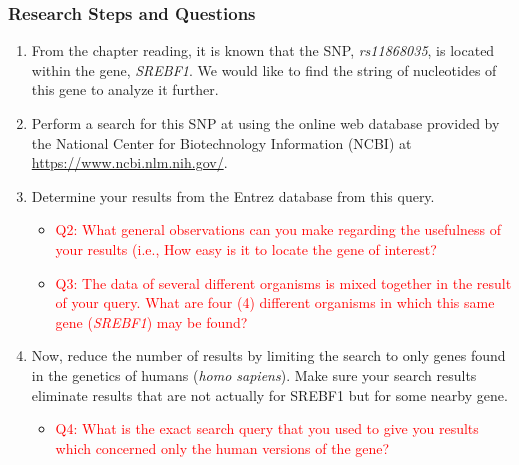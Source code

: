 \subsubsection*{Research Steps and Questions}
\begin{enumerate}
	\item From the chapter reading, it is known that the SNP, \emph{rs11868035}, is located within the gene, \emph{SREBF1}. We would like to find the string of nucleotides of this gene to analyze it further.  
	
	\item Perform a search for this SNP at using the online web database provided by the National Center for Biotechnology Information (NCBI) at \url{https://www.ncbi.nlm.nih.gov/}. 
	\begin{itemize}
		\color{red}{\item Q1: According to NCBI, which particular database are you using to find this gene?}
	\end{itemize}
	
	
	\item Determine your results from the Entrez database from this query.
	\begin{itemize}
		\item \textcolor{red}{ Q2: What general observations can you make regarding the usefulness of your results (i.e., How easy is it to locate the gene of interest?}
		\item \textcolor{red}{ Q3: The data of several different organisms is mixed together in the result of your query. What are four (4) different organisms in which this same gene (\emph{SREBF1}) may be found?}
	\end{itemize}
	\item Now, reduce the number of results by limiting the search to only genes found in the genetics of humans (\emph{homo sapiens}). Make sure your search results eliminate results that are not actually for SREBF1 but for some nearby gene. 
	\begin{itemize}
		\item \textcolor{red}{ Q4: What is the exact search query that you used to give you results which concerned only the human versions of the gene?}
	\end{itemize}


\end{enumerate}
